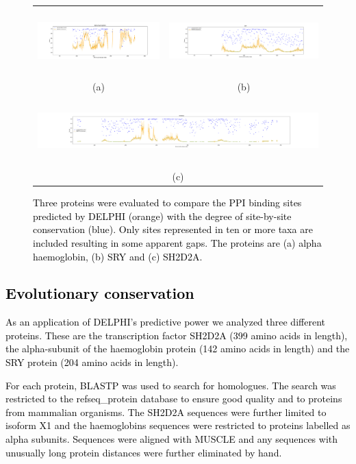 \documentclass{bioinfo}
\newcommand{\mySecondColor}{black}
\begin{document}
\begin{figure}
\centering
\begin{tabular}{cc}
\includegraphics[height=2.55cm]{hemoglobin_top178_conservation.pdf} & 
\includegraphics[height=2.55cm]{SRY_conservation.pdf}\\
\small (a) & \small (b)\\
\multicolumn{2}{c}{\includegraphics[height=2.55cm]{SH2_conservation.pdf}}\\
\multicolumn{2}{c}{\small (c)}
\end{tabular}
  \caption{\textcolor{\mySecondColor}{Three proteins were evaluated to compare the PPI binding sites predicted by DELPHI (orange) with the degree of site-by-site conservation (blue).  Only sites represented in ten or more taxa are included resulting in some apparent gaps.  The proteins are (a) alpha haemoglobin, (b) SRY and (c) SH2D2A.} 
  \label{fig_conservation_vs_sitePred}}
\end{figure}


\subsection{\textcolor{\mySecondColor}{Evolutionary conservation}}

\textcolor{\mySecondColor}{As an application of DELPHI's predictive power we analyzed three different proteins.  These are the transcription factor SH2D2A (399 amino acids in length), the alpha-subunit of the haemoglobin protein (142 amino acids in length) and the SRY protein (204 amino acids
in length).}

\textcolor{\mySecondColor}{For each protein, BLASTP was used to search for homologues.  The search was restricted to the refseq\_protein database to ensure good quality and
to proteins from mammalian organisms.  The SH2D2A sequences were further
limited to isoform X1 and the haemoglobins sequences were restricted to
proteins labelled as alpha subunits.  Sequences were aligned with MUSCLE
\citep{edgar2004muscle} and any sequences with unusually long protein distances
were further eliminated by hand.}
\end{document}
